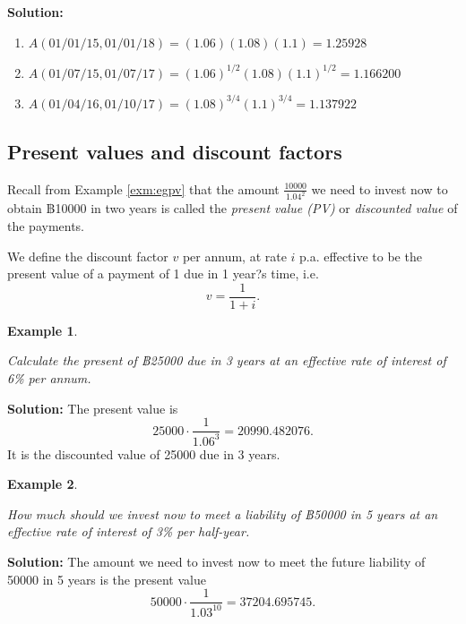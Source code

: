 \documentclass[
]{book}
\theoremstyle{definition}
\theoremstyle{definition}
\newtheorem{example}{Example}[chapter]
\theoremstyle{definition}
\theoremstyle{definition}
\theoremstyle{remark}
\begin{document}
\textbf{Solution:}

\begin{enumerate}
\def\labelenumi{\arabic{enumi}.}
\item
  \(A(01/01/15, 01/01/18) = (1.06)(1.08)(1.1) = 1.25928\)
\item
  \(A(01/07/15, 01/07/17) = (1.06)^{1/2}(1.08)(1.1)^{1/2} = 1.166200\)
\item
  \(A(01/04/16, 01/10/17) = (1.08)^{3/4}(1.1)^{3/4} = 1.137922\)
\end{enumerate}

\hypertarget{present-values-and-discount-factors}{%
\subsection{Present values and discount factors}\label{present-values-and-discount-factors}}

Recall from Example \ref{exm:egpv} that the amount
\(\displaystyle{\frac{10000}{1.04^2}}\) we need to invest now to obtain
฿10000 in two years is called the \emph{present value (PV)} or \emph{discounted
value} of the payments.

We define the discount factor \(v\) per annum, at rate \(i\) p.a. effective
to be the present value of a payment of 1 due in 1 year?s time, i.e.
\[v = \frac{1}{1+i}.\]

\begin{example}
\protect\hypertarget{exm:unlabeled-div-21}{}\label{exm:unlabeled-div-21}

\emph{Calculate the present of ฿25000 due in 3 years at an effective rate of
interest of 6\% per annum.}

\end{example}

\textbf{Solution:} The present value is
\[25000 \cdot \frac{1}{1.06^3} = 20990.482076.\] It is the discounted
value of 25000 due in 3 years.

\begin{example}
\protect\hypertarget{exm:unlabeled-div-22}{}\label{exm:unlabeled-div-22}

\emph{How much should we invest now to meet a liability of ฿50000 in 5 years
at an effective rate of interest of 3\% per half-year.}

\end{example}

\textbf{Solution:} The amount we need to invest now to meet the future
liability of 50000 in 5 years is the present value
\[50000 \cdot \frac{1}{1.03^{10}} = 37204.695745.\]
\end{document}
